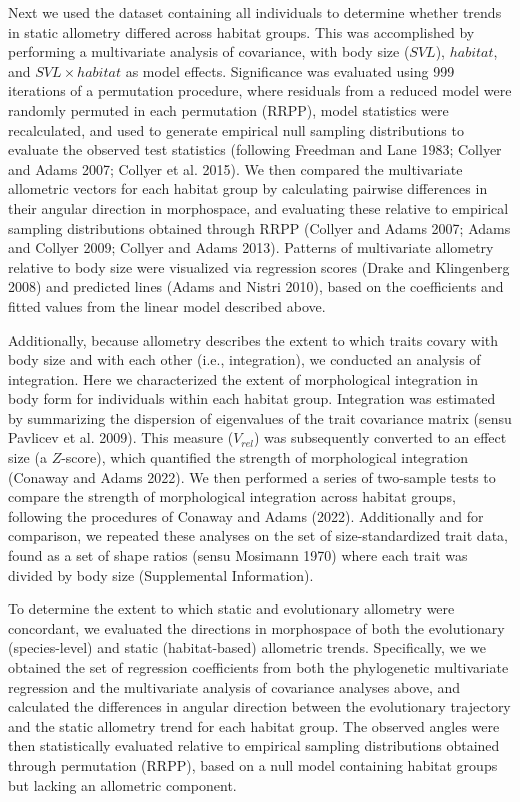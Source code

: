 \documentclass[
  11pt,
]{article}
\begin{document}
Next we used the dataset containing all individuals to determine whether
trends in static allometry differed across habitat groups. This was
accomplished by performing a multivariate analysis of covariance, with
body size (\(SVL\)), \(habitat\), and \(SVL\times habitat\) as model
effects. Significance was evaluated using 999 iterations of a
permutation procedure, where residuals from a reduced model were
randomly permuted in each permutation (RRPP), model statistics were
recalculated, and used to generate empirical null sampling distributions
to evaluate the observed test statistics (following Freedman and Lane
1983; Collyer and Adams 2007; Collyer et al. 2015). We then compared the
multivariate allometric vectors for each habitat group by calculating
pairwise differences in their angular direction in morphospace, and
evaluating these relative to empirical sampling distributions obtained
through RRPP (Collyer and Adams 2007; Adams and Collyer 2009; Collyer
and Adams 2013). Patterns of multivariate allometry relative to body
size were visualized via regression scores (Drake and Klingenberg 2008)
and predicted lines (Adams and Nistri 2010), based on the coefficients
and fitted values from the linear model described above. \hfill\break

Additionally, because allometry describes the extent to which traits
covary with body size and with each other (i.e., integration), we
conducted an analysis of integration. Here we characterized the extent
of morphological integration in body form for individuals within each
habitat group. Integration was estimated by summarizing the dispersion
of eigenvalues of the trait covariance matrix (sensu Pavlicev et al.
2009). This measure (\(V_{rel}\)) was subsequently converted to an
effect size (a \(Z\)-score), which quantified the strength of
morphological integration (Conaway and Adams 2022). We then performed a
series of two-sample tests to compare the strength of morphological
integration across habitat groups, following the procedures of Conaway
and Adams (2022). Additionally and for comparison, we repeated these
analyses on the set of size-standardized trait data, found as a set of
shape ratios (sensu Mosimann 1970) where each trait was divided by body
size (Supplemental Information). \hfill\break

To determine the extent to which static and evolutionary allometry were
concordant, we evaluated the directions in morphospace of both the
evolutionary (species-level) and static (habitat-based) allometric
trends. Specifically, we we obtained the set of regression coefficients
from both the phylogenetic multivariate regression and the multivariate
analysis of covariance analyses above, and calculated the differences in
angular direction between the evolutionary trajectory and the static
allometry trend for each habitat group. The observed angles were then
statistically evaluated relative to empirical sampling distributions
obtained through permutation (RRPP), based on a null model containing
habitat groups but lacking an allometric component. \hfill\break
\end{document}
